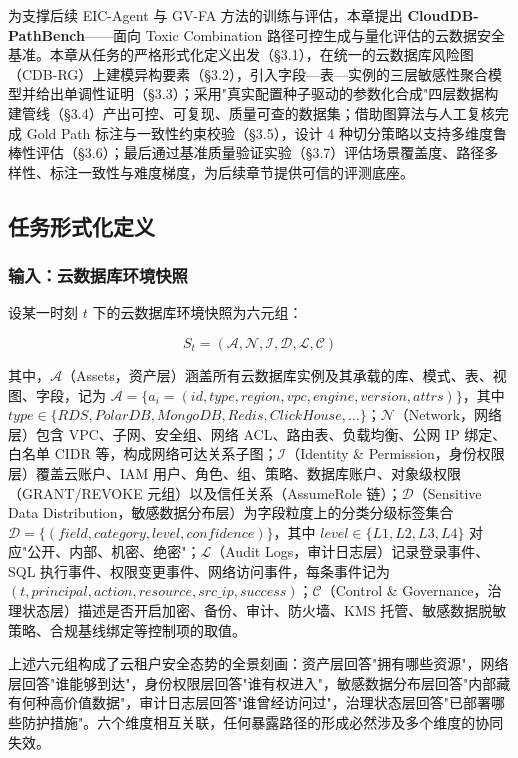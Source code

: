 \documentclass[a4paper,12pt]{ctexart}
\begin{document}
为支撑后续 EIC-Agent 与 GV-FA 方法的训练与评估，本章提出 \textbf{CloudDB-PathBench}——面向 Toxic Combination 路径可控生成与量化评估的云数据安全基准。本章从任务的严格形式化定义出发（§3.1），在统一的云数据库风险图（CDB-RG）上建模异构要素（§3.2），引入字段—表—实例的三层敏感性聚合模型并给出单调性证明（§3.3）；采用"真实配置种子驱动的参数化合成"四层数据构建管线（§3.4）产出可控、可复现、质量可查的数据集；借助图算法与人工复核完成 Gold Path 标注与一致性约束校验（§3.5），设计 4 种切分策略以支持多维度鲁棒性评估（§3.6）；最后通过基准质量验证实验（§3.7）评估场景覆盖度、路径多样性、标注一致性与难度梯度，为后续章节提供可信的评测底座。

\subsection{任务形式化定义}

\subsubsection{输入：云数据库环境快照}

设某一时刻 $t$ 下的云数据库环境快照为六元组：

\[S_t = (\mathcal{A}, \mathcal{N}, \mathcal{I}, \mathcal{D}, \mathcal{L}, \mathcal{C})\]

其中，$\mathcal{A}$（Assets，资产层）涵盖所有云数据库实例及其承载的库、模式、表、视图、字段，记为 $\mathcal{A} = \{a_i = (id, type, region, vpc, engine, version, attrs)\}$，其中 $type \in \{RDS, PolarDB, MongoDB, Redis, ClickHouse, \ldots\}$；$\mathcal{N}$（Network，网络层）包含 VPC、子网、安全组、网络 ACL、路由表、负载均衡、公网 IP 绑定、白名单 CIDR 等，构成网络可达关系子图；$\mathcal{I}$（Identity \& Permission，身份权限层）覆盖云账户、IAM 用户、角色、组、策略、数据库账户、对象级权限（GRANT/REVOKE 元组）以及信任关系（AssumeRole 链）；$\mathcal{D}$（Sensitive Data Distribution，敏感数据分布层）为字段粒度上的分类分级标签集合 $\mathcal{D} = \{(field, category, level, confidence)\}$，其中 $level \in \{L1, L2, L3, L4\}$ 对应"公开、内部、机密、绝密"；$\mathcal{L}$（Audit Logs，审计日志层）记录登录事件、SQL 执行事件、权限变更事件、网络访问事件，每条事件记为 $(t, principal, action, resource, src\_ip, success)$；$\mathcal{C}$（Control \& Governance，治理状态层）描述是否开启加密、备份、审计、防火墙、KMS 托管、敏感数据脱敏策略、合规基线绑定等控制项的取值。

上述六元组构成了云租户安全态势的全景刻画：资产层回答"拥有哪些资源"，网络层回答"谁能够到达"，身份权限层回答"谁有权进入"，敏感数据分布层回答"内部藏有何种高价值数据"，审计日志层回答"谁曾经访问过"，治理状态层回答"已部署哪些防护措施"。六个维度相互关联，任何暴露路径的形成必然涉及多个维度的协同失效。
\end{document}
